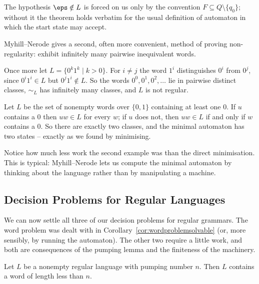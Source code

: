\begin{remark}
	The hypothesis $\eps \notin L$ is forced on us only by the convention $F \subseteq Q \setminus \{q_0\}$; without it the theorem holds verbatim for the usual definition of automaton in which the start state may accept.
\end{remark}

Myhill--Nerode gives a second, often more convenient, method of proving non-regularity: exhibit infinitely many pairwise inequivalent words.

\begin{example}
	Once more let $L = \{0^k1^k \mid k > 0\}$. For $i \neq j$ the word $1^i$ distinguishes $0^i$ from $0^j$, since $0^i1^i \in L$ but $0^j1^i \notin L$. So the words $0^0, 0^1, 0^2, \dots$ lie in pairwise distinct classes, $\sim_L$ has infinitely many classes, and $L$ is not regular.
\end{example}

\begin{example}
	Let $L$ be the set of nonempty words over $\{0,1\}$ containing at least one $0$. If $u$ contains a $0$ then $uw \in L$ for every $w$; if $u$ does not, then $uw \in L$ if and only if $w$ contains a $0$. So there are exactly two classes, and the minimal automaton has two states -- exactly as we found by minimising.
\end{example}

Notice how much less work the second example was than the direct minimisation. This is typical: Myhill--Nerode lets us compute the minimal automaton by thinking about the language rather than by manipulating a machine.

\subsection{Decision Problems for Regular Languages}

We can now settle all three of our decision problems for regular grammars. The word problem was dealt with in Corollary~\ref{cor:wordproblemsolvable} (or, more sensibly, by running the automaton). The other two require a little work, and both are consequences of the pumping lemma and the finiteness of the machinery.

\begin{lemma}\label{lem:shortword}
	Let $L$ be a nonempty regular language with pumping number $n$. Then $L$ contains a word of length less than $n$.
\end{lemma}


